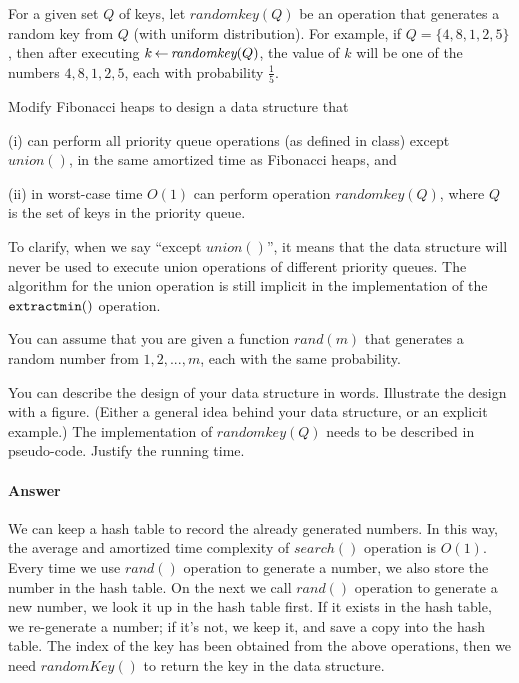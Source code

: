 \documentclass[11pt]{article}
\newcommand{\extractmin}{{\mbox{\tt extractmin}}}
\begin{document}
\newcommand{\randomkey}{\textit{randomkey}} 
\newcommand{\randomint}{\textit{rand}} 
\newcommand{\union}{\textit{union}} 

\begin{problem}
For a given set $Q$ of keys, let $\randomkey(Q)$ be an operation that generates
a random key from $Q$ (with uniform distribution). For example, if 
$Q = \{4,8,1,2,5\}$, then after executing $k \assign\randomkey(Q)$, the
value of $k$ will be one of the numbers $4,8,1,2,5$, each with probability $\frac{1}{5}$.

Modify Fibonacci heaps to design a data structure that 
%
\begin{description}
	\item{(i)} can perform all priority queue operations
(as defined in class) except $\union()$, in the same amortized time as Fibonacci heaps, and 
	\item{(ii)} in worst-case time $O(1)$ can perform operation
	$\randomkey(Q)$, where $Q$ is the set of keys in the priority queue. 
\end{description}

To clarify, when we say ``except $\union()$'', it means that the data structure will
never be used to execute union operations of different priority queues.
The algorithm for the union operation is still implicit in the implementation of the
$\extractmin()$ operation.

You can assume that you are given a function $\randomint(m)$ that
generates a random number from $1,2,...,m$, each with the same probability.  

You can describe the design of your data structure in words. Illustrate the design
with a figure. (Either a general idea behind your data structure, or an explicit example.)
The implementation of  $\randomkey(Q)$ needs to be described in pseudo-code.
Justify the running time.

\end{problem}

\let\oldReturn\Return
\renewcommand{\Return}{\State\oldReturn}

\paragraph{Answer}
We can keep a hash table to record the already generated numbers. In this way, the average and amortized time complexity of $search()$ operation is $O(1)$.
Every time we use $rand()$ operation to generate a number, we also store the number in the hash table. On the next we call $rand()$ operation to generate a new number, we look it up in the hash table first. If it exists in the hash table, we re-generate a number; if it's not, we keep it, and save a copy into the hash table. The index of the key has been obtained from the above operations, then we need $randomKey()$ to return the key in the data structure.
\end{document}
